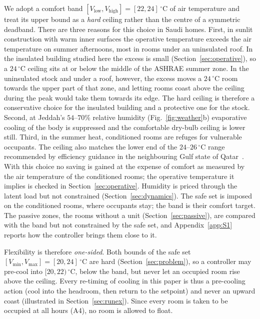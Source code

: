 \documentclass[10pt,a4paper,twocolumn]{article}
\theoremstyle{definition}
\begin{document}
We adopt a comfort band $[V_{\text{low}},V_{\text{high}}]=[22,24]\,^{\circ}$C of air temperature and treat its upper bound as a \emph{hard} ceiling rather than the centre of a symmetric deadband. There are three reasons for this choice in Saudi homes. First, in sunlit construction with warm inner surfaces the operative temperature exceeds the air temperature on summer afternoons, most in rooms under an uninsulated roof. In the insulated building studied here the excess is small (Section~\ref{sec:operative}), so a $24\,^{\circ}$C ceiling sits at or below the middle of the ASHRAE summer zone. In the uninsulated stock and under a roof, however, the excess moves a $24\,^{\circ}$C room towards the upper part of that zone, and letting rooms coast above the ceiling during the peak would take them towards its edge. The hard ceiling is therefore a conservative choice for the insulated building and a protective one for the stock. Second, at Jeddah's $54$--$70\%$ relative humidity (Fig.~\ref{fig:weather}b) evaporative cooling of the body is suppressed and the comfortable dry-bulb ceiling is lower still. Third, in the summer heat, conditioned rooms are refuges for vulnerable occupants. The ceiling also matches the lower end of the $24$--$26\,^{\circ}$C range recommended by efficiency guidance in the neighbouring Gulf state of Qatar~\citep{tarsheed_setpoint}. With this choice no saving is gained at the expense of comfort as measured by the air temperature of the conditioned rooms; the operative temperature it implies is checked in Section~\ref{sec:operative}. Humidity is priced through the latent load but not constrained (Section~\ref{sec:dynamics}). The safe set is imposed on the conditioned rooms, where occupants stay; the band is their comfort target. The passive zones, the rooms without a unit (Section~\ref{sec:passive}), are compared with the band but not constrained by the safe set, and Appendix~\ref{app:S1} reports how the controller brings them close to it.

Flexibility is therefore \emph{one-sided}. Both bounds of the safe set $[V_{\min},V_{\max}]=[20,24]\,^{\circ}$C are hard (Section~\ref{sec:problem}), so a controller may pre-cool into $[20,22)\,^{\circ}$C, below the band, but never let an occupied room rise above the ceiling. Every re-timing of cooling in this paper is thus a pre-cooling action (cool into the headroom, then return to the setpoint) and never an upward coast (illustrated in Section~\ref{sec:runex}). Since every room is taken to be occupied at all hours (A4), no room is allowed to float.
\end{document}
